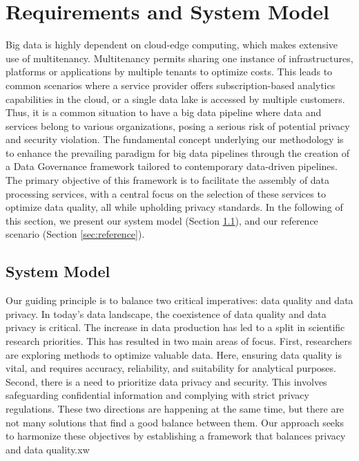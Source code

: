 
\section{Requirements and System Model}\label{sec:requirements}
Big data is highly dependent on cloud-edge computing, which makes extensive use of multitenancy.
Multitenancy permits sharing one instance of infrastructures, platforms or applications by multiple tenants to optimize costs.
This leads to common scenarios where a service provider offers subscription-based analytics capabilities in the cloud,
or a single data lake is accessed by multiple customers.
Thus, it is a common situation to have a big data pipeline where data and services belong to various organizations,
posing a serious risk of potential privacy and security violation.
The fundamental concept underlying our methodology is to enhance the prevailing paradigm for big data pipelines through the creation of a Data Governance framework tailored to contemporary data-driven pipelines.
The primary objective of this framework is to facilitate the assembly of data processing services, with a central focus on the selection of these services to optimize data quality, all while upholding privacy standards.
In the following of this section,
we present our system model (Section \ref{sec:systemmodel}),
and our reference scenario (Section \ref{sec:reference}).

\subsection{System Model}\label{sec:systemmodel}

Our guiding principle is to balance two critical imperatives: data quality and data privacy.
In today's data landscape, the coexistence of data quality and data privacy is critical.
The increase in data production has led to a split in scientific research priorities. This has resulted in two main areas of focus.
First, researchers are exploring methods to optimize valuable data. Here, ensuring data quality is vital, and requires accuracy, reliability, and suitability for analytical purposes.
Second, there is a need to prioritize data privacy and security. This involves safeguarding confidential information and complying with strict privacy regulations.
These two directions are happening at the same time, but there are not many solutions that find a good balance between them.
Our approach seeks to harmonize these objectives by establishing a framework that balances privacy and data quality.xw

